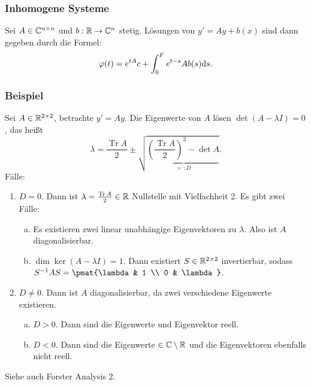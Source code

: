 \subsubsection{Inhomogene Systeme}
Sei $A \in \mathbb{C}^{n \times n}$ und $b: \mathbb{R} \to \mathbb{C}^n$ stetig. Lösungen
von $y' = Ay + b(x)$ sind dann gegeben durch die Formel:
\[ \varphi(t) = e^{tA} c + \int_0^F e^{t-s}A b(s) \mathrm{d} s. \]

\subsubsection{Beispiel}
Sei $A \in \mathbb{R}^{2 \times 2}$, betrachte $y' = Ay$. Die Eigenwerte von $A$
lösen $\det(A-\lambda I) = 0$, das heißt
\[ \lambda = \frac{\operatorname{Tr} A}{2} \pm \sqrt{ \underbrace{\left(
        \frac{\operatorname{Tr} A}{2} \right)^2 - \det A}_{=: D}}. \]
Fälle:
\begin{enumerate}
\item $D=0$. Dann ist $\lambda = \frac{\operatorname{Tr} A}{2} \in \mathbb{R}$
  Nullstelle mit Vielfachheit 2. Es gibt zwei Fälle:
  \begin{enumerate}[a)]
  \item Es existieren zwei linear unabhängige Eigenvektoren zu $\lambda$. Also
    ist $A$ diagonalisierbar.
  \item $\dim \ker (A-\lambda I) = 1$. Dann existiert $S \in \mathbb{R}^{2 \times 2}$
    invertierbar, sodass $S^{-1}AS= \pmat{\lambda & 1 \\ 0 & \lambda}$.
  \end{enumerate}
\item $D \ne 0$. Dann ist $A$ diagonalisierbar, da zwei verschiedene Eigenwerte
  existieren.
  \begin{enumerate}[a)]
  \item $D > 0$. Dann sind die Eigenwerte und Eigenvektor reell.
  \item $D < 0$. Dann sind die Eigenwerte $\in \mathbb{C} \setminus \mathbb{R}$ und
    die Eigenvektoren ebenfalls nicht reell.
  \end{enumerate}  
\end{enumerate}

Siehe auch Forster Analysis 2.
